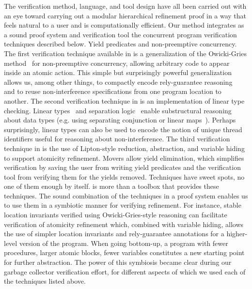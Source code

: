 The verification method, language, and tool design have all been carried out with an eye toward carrying out a modular hierarchical refinement proof in a way that feels natural to a user and is computationally efficient. Our method integrates as a sound proof system and verification tool the concurrent program verification techniques described below. 
Yield predicates and non-preemptive concurrency. 
The first verification technique available in \civl is a generalization of the Owicki-Gries method~\cite{OwickiG76} for non-preemptive concurrency, 
allowing arbitrary code to appear inside an atomic action.
This simple but surprisingly powerful generalization allows us, among other things, to compactly encode rely-guarantee reasoning~\cite{Jones83}
and to reuse non-interference specifications from one program location to another.
The second verification technique in \civl is an implementation of linear type checking.
Linear types~\cite{Wadler90lineartypes} and separation logic~\cite{Reynolds02} enable substructural reasoning about data types
(e.g. using separating conjunction or linear maps~\cite{LahiriQW11}).
Perhaps surprisingly, linear types can also be used to encode the notion of unique thread identifiers useful for reasoning about non-interference.
The third verification technique in \civl is the use of Lipton-style reduction, abstraction, and variable hiding to support atomicity refinement.  
Movers allow yield elimination, which simplifies verification by saving the user from writing yield predicates and the verification tool from verifying them for the yields removed. 
 Techniques have sweet spots, no one of them enough by itself. 
\civl is more than a toolbox that provides these techniques. The sound combination of the techniques in a proof system enables us to use them in a symbiotic manner for verifying refinement. 
For instance, stable location invariants verified using Owicki-Gries-style reasoning can facilitate verification of atomicity refinement which, combined with variable hiding, allows the use of simpler location invariants and rely-guarantee annotations for a higher-level version of the program. When going bottom-up, a program with fewer procedures, larger atomic blocks, fewer variables constitutes a new starting point for further abstraction.
The power of this symbiosis became clear during our garbage collector verification effort, for different aspects of which we used each of the techniques listed above. 

